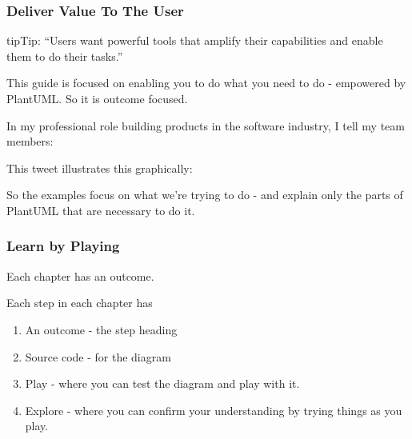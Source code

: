 \documentclass[letterpaper,10pt,english]{sphinxmanual}
\begin{document}
\subsubsection{Deliver Value To The User}
\label{\detokenize{about/AboutThisGuide:deliver-value-to-the-user}}\label{\detokenize{about/AboutThisGuide:delivervalue-label}}
\begin{sphinxadmonition}{tip}{Tip:}
“Users want powerful tools that amplify their capabilities and enable them to do their tasks.”

\end{sphinxadmonition}

This guide is focused on enabling you to do what you need to do - empowered by PlantUML.
So it is outcome focused.

In my professional role building products in the software industry, I tell my team members:

This tweet illustrates this graphically:

\begin{sphinxVerbatim}[commandchars=\\\{\}]
  
\end{sphinxVerbatim}

So the examples focus on what we’re trying to do - and explain only the parts of PlantUML that are necessary to do it.


\subsubsection{Learn by Playing}
\label{\detokenize{about/AboutThisGuide:learn-by-playing}}
Each chapter has an outcome.

Each step in each chapter has
\begin{enumerate}
%
\item {} 
An outcome - the step heading

\item {} 
Source code - for the diagram

\item {} 
Play - where you can test the diagram and play with it.

\item {} 
Explore - where you can confirm your understanding by trying things as you play.

\end{enumerate}
\end{document}
